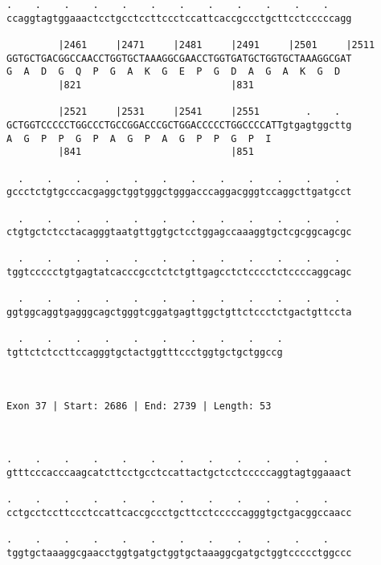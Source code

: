 \documentclass{article}
\begin{document}
\begin{Verbatim}
.    .    .    .    .    .    .    .    .    .    .    .    
ccaggtagtggaaactcctgcctccttccctccattcaccgccctgcttcctcccccagg
                                                            
         |2461     |2471     |2481     |2491     |2501     |2511
GGTGCTGACGGCCAACCTGGTGCTAAAGGCGAACCTGGTGATGCTGGTGCTAAAGGCGAT
G  A  D  G  Q  P  G  A  K  G  E  P  G  D  A  G  A  K  G  D  
         |821                          |831                 
  
         |2521     |2531     |2541     |2551        .    .  
GCTGGTCCCCCTGGCCCTGCCGGACCCGCTGGACCCCCTGGCCCCATTgtgagtggcttg
A  G  P  P  G  P  A  G  P  A  G  P  P  G  P  I              
         |841                          |851                 
  
  .    .    .    .    .    .    .    .    .    .    .    .  
gccctctgtgcccacgaggctggtgggctgggacccaggacgggtccaggcttgatgcct
                                                            
  .    .    .    .    .    .    .    .    .    .    .    .  
ctgtgctctcctacagggtaatgttggtgctcctggagccaaaggtgctcgcggcagcgc
                                                            
  .    .    .    .    .    .    .    .    .    .    .    .  
tggtccccctgtgagtatcacccgcctctctgttgagcctctcccctctccccaggcagc
                                                            
  .    .    .    .    .    .    .    .    .    .    .    .  
ggtggcaggtgagggcagctgggtcggatgagttggctgttctccctctgactgttccta
                                                            
  .    .    .    .    .    .    .    .    .    .
tgttctctccttccagggtgctactggtttccctggtgctgctggccg
                                                
                                                
 
Exon 37 | Start: 2686 | End: 2739 | Length: 53



.    .    .    .    .    .    .    .    .    .    .    .    
gtttcccacccaagcatcttcctgcctccattactgctcctcccccaggtagtggaaact
                                                            
.    .    .    .    .    .    .    .    .    .    .    .    
cctgcctccttccctccattcaccgccctgcttcctcccccagggtgctgacggccaacc
                                                            
.    .    .    .    .    .    .    .    .    .    .    .    
tggtgctaaaggcgaacctggtgatgctggtgctaaaggcgatgctggtccccctggccc
                                                            

\end{Verbatim}
\end{document}
